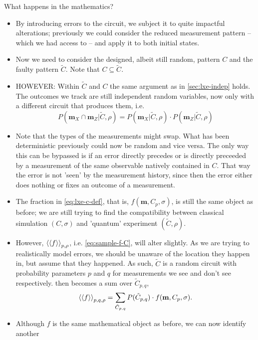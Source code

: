 \par{What happens in the mathematics?}
\begin{itemize}
  \item By introducing errors to the circuit, we subject it to quite impactful
    alterations; previously we could consider the reduced measurement
    pattern -- which we had access to -- and apply it to both initial states.
  \item Now we need to consider the designed, albeit still random, pattern $C$
    and the faulty pattern $\tilde{C}$. Note that $C\subseteq\tilde{C}$.
  \item HOWEVER: Within $\tilde{C}$ and $C$ the same argument as in
    \cref{sec:lxe-indep} holds. The outcomes we track are still independent
    random variables, now only with a different circuit that produces them,
    i.e. \[ P(\mathbf{m}_X \cap \mathbf{m}_Z | \tilde{C}, \rho) = 
    P(\mathbf{m}_X | \tilde{C}, \rho)\cdot P(\mathbf{m}_Z | \tilde{C}, \rho) \]
  \item Note that the types of the measurements might swap. What has been
    deterministic previously could now be random and vice versa. The only way
    this can be bypassed is if an error directly precedes or is directly preceeded by a
    measurement of the same observable natively contained in $C$. That way the
    error is not 'seen' by the measurement history, since then the error either
    does nothing or fixes an outcome of a measurement.
  \item The fraction in \cref{eq:lxe-c-def}, that is, $f(\mathbf{m}, C_p,
    \sigma)$, is still the same object as before;
    we are still trying to find the compatibility between classical simulation
    $(C, \sigma)$ and 'quantum' experiment $(\tilde{C}, \rho)$.
  \item However, $\expval{\expval{f}}_{p,\rho}$, i.e. \cref{eq:sample-f-C},
    will alter slightly. As we are trying to realistically model errors, we
    should be unaware of the location they happen in, but assume that they
    happened. As such, $\tilde{C}$ is a random circuit with probability
    parameters $p$ and $q$ for measurements we see and don't see respectively.
     then becomes a sum over $\tilde{C}_{p,q}$,
    \begin{align} \label{eq:sample-f-Ctilde}
      \expval{\expval{f}}_{p,q,\rho} = \sum_{\tilde{C}_{p,q}} P(\tilde{C}_{p,q})
      \cdot f(\mathbf{m},C_p, \sigma)
    .\end{align}
  \item Although $f$ is the same mathematical object as before, we can now identify another

\end{itemize}
